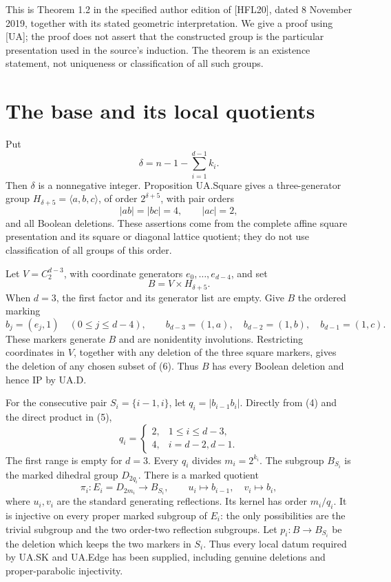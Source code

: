 This is Theorem 1.2 in the specified author edition of {[}HFL20{]},
dated 8 November 2019, together with its stated geometric
interpretation. We give a proof using {[}UA{]}; the proof does not
assert that the constructed group is the particular presentation used in
the source's induction. The theorem is an existence statement, not
uniqueness or classification of all such groups.

\section{The base and its local quotients}\label{the-base-and-its-local-quotients}
Put \[
\delta=n-1-\sum_{i=1}^{d-1}k_i.
\tag{3}
\] Then \(\delta\) is a nonnegative integer. Proposition UA.Square gives
a three-generator group \(H_{\delta+5}=\langle a,b,c\rangle\), of order
\(2^{\delta+5}\), with pair orders \[
|ab|=|bc|=4,\qquad |ac|=2,
\tag{4}
\] and all Boolean deletions. These assertions come from the complete
affine square presentation and its square or diagonal lattice quotient;
they do not use classification of all groups of this order.

Let \(V=C_2^{d-3}\), with coordinate generators \(e_0,\ldots,e_{d-4}\),
and set \[
B=V\times H_{\delta+5}.
\tag{5}
\] When \(d=3\), the first factor and its generator list are empty. Give
\(B\) the ordered marking \[
b_j=(e_j,1)\quad(0\le j\le d-4),\qquad
b_{d-3}=(1,a),\quad b_{d-2}=(1,b),\quad b_{d-1}=(1,c).
\tag{6}
\] These markers generate \(B\) and are nonidentity involutions.
Restricting coordinates in \(V\), together with any deletion of the
three square markers, gives the deletion of any chosen subset of (6).
Thus \(B\) has every Boolean deletion and hence IP by UA.D.

For the consecutive pair \(S_i=\{i-1,i\}\), let \(q_i=|b_{i-1}b_i|\).
Directly from (4) and the direct product in (5), \[
q_i=\begin{cases}
2,&1\le i\le d-3,\\
4,&i=d-2,d-1.
\end{cases}
\tag{7}
\] The first range is empty for \(d=3\). Every \(q_i\) divides
\(m_i=2^{k_i}\). The subgroup \(B_{S_i}\) is the marked dihedral group
\(D_{2q_i}\). There is a marked quotient \[
\pi_i:E_i=D_{2m_i}\longrightarrow B_{S_i},\qquad
u_i\longmapsto b_{i-1},\quad v_i\longmapsto b_i,
\tag{8}
\] where \(u_i,v_i\) are the standard generating reflections. Its kernel
has order \(m_i/q_i\). It is injective on every proper marked subgroup
of \(E_i\): the only possibilities are the trivial subgroup and the two
order-two reflection subgroups. Let \(p_i:B\to B_{S_i}\) be the deletion
which keeps the two markers in \(S_i\). Thus every local datum required
by UA.SK and UA.Edge has been supplied, including genuine deletions and
proper-parabolic injectivity.

